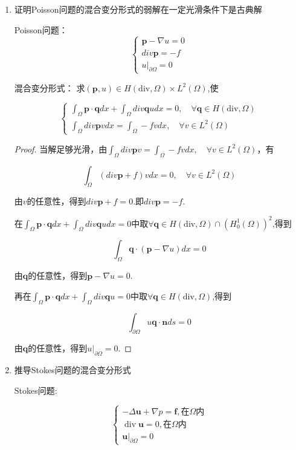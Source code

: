 \documentclass[12pt,a4paper]{article}
\begin{document}
	\begin{enumerate}
		\item 证明Poisson问题的混合变分形式的弱解在一定光滑条件下是古典解
		
		Poisson问题：
		$$\begin{cases}
			\mathbf{p} - \nabla u = 0 \\
			div \mathbf{p} = - f \\
			u |_{\partial \Omega} = 0
		\end{cases}$$
		
		混合变分形式：
		求$(\mathbf{p},u)\in H(\mathrm{div},\Omega)\times L^2(\Omega)$,使
		
		$$\begin{cases}
			\int_\Omega \mathbf{p}\cdot\mathbf{q} dx + \int_\Omega div\mathbf{q} u dx= 0,\quad \forall \mathbf{q} \in H(\mathrm{div},\Omega) \\
			\int_\Omega div\mathbf{p} v dx= \int_\Omega -f v dx,\quad \forall v \in L^2(\Omega)
		\end{cases}$$
		
		\begin{proof}
			当解足够光滑，由$	\int_\Omega div\mathbf{p} v = \int_\Omega -f v dx,\quad \forall v \in L^2(\Omega) $，有
			
			$$	\int_\Omega (div\mathbf{p} + f) v dx =0 ,\quad \forall v \in L^2(\Omega)$$
			
			由$v$的任意性，得到$div\mathbf{p} + f = 0$.即$div\mathbf{p} = -f$.
			
			在$\int_\Omega \mathbf{p}\cdot\mathbf{q} dx + \int_\Omega div\mathbf{q} u dx= 0$中取$\forall \mathbf{q} \in H(\mathrm{div},\Omega) \cap (H_0^1(\Omega))^2$,得到
			
			$$\int_{\Omega} \mathbf{q}\cdot(\mathbf{p}-\nabla u) dx= 0$$
			
			由$\mathbf{q}$的任意性，得到$	\mathbf{p} - \nabla u = 0$.
			
			再在$\int_\Omega \mathbf{p}\cdot\mathbf{q} dx + \int_\Omega div\mathbf{q} u = 0$中取$\forall \mathbf{q} \in H(\mathrm{div},\Omega)$,得到
			
			$$\int_{\partial \Omega} u \mathbf{q}\cdot\mathbf{n} ds= 0$$
			
			由$\mathbf{q}$的任意性，得到$	u |_{\partial \Omega} = 0$.
		\end{proof}
		\item 推导Stokes问题的混合变分形式
		
		
		Stokes问题:
		
		$$\begin{cases}-\Delta\mathbf{u}+\nabla p=\mathbf{f},\text{在}\Omega\text{内}\\\operatorname{div}\mathbf{u}=0,\text{在}\Omega\text{内}\\\mathbf{u}|_{\partial\Omega}=0\end{cases}$$
		

\end{enumerate}
\end{document}
